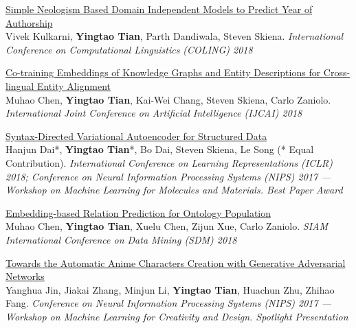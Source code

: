 \documentclass[line,margin]{cv}
\begin{document}
\begin{resume}
{  \begin{samepage}
  \href{http://aclweb.org/anthology/C18-1017}{Simple Neologism Based Domain Independent Models to Predict Year of Authorship}\\
  Vivek Kulkarni, \textbf{Yingtao Tian}, Parth Dandiwala, Steven Skiena. \emph{International Conference on Computational Linguistics (COLING) 2018}
  \par\end{samepage}

  \begin{samepage}
  \href{https://arxiv.org/abs/1806.06478}{Co-training Embeddings of Knowledge Graphs and Entity Descriptions for Cross-lingual Entity Alignment}\\
  Muhao Chen, \textbf{Yingtao Tian}, Kai-Wei Chang, Steven Skiena, Carlo Zaniolo. \emph{International Joint Conference on Artificial Intelligence (IJCAI) 2018}
  \par\end{samepage}

  \begin{samepage}
  \href{https://openreview.net/forum?id=SyqShMZRb}{Syntax-Directed Variational Autoencoder for Structured Data}\\
  Hanjun Dai*, \textbf{Yingtao Tian}*, Bo Dai, Steven Skiena, Le Song (* Equal Contribution). \emph{International Conference on Learning Representations (ICLR) 2018; Conference on Neural Information Processing Systems (NIPS) 2017 --- Workshop on Machine Learning for Molecules and Materials. Best Paper Award}
  \par\end{samepage}

  \begin{samepage}
  \href{https://arxiv.org/abs/1809.02382}{Embedding-based Relation Prediction for Ontology Population}\\
  Muhao Chen, \textbf{Yingtao Tian}, Xuelu Chen, Zijun Xue, Carlo Zaniolo. \emph{SIAM International Conference on Data Mining (SDM) 2018}
  \par\end{samepage}

  \begin{samepage}
  \href{https://nips2017creativity.github.io/doc/High\_Quality\_Anime.pdf}{Towards the Automatic Anime Characters Creation with Generative Adversarial Networks}\\
  Yanghua Jin, Jiakai Zhang, Minjun Li, \textbf{Yingtao Tian}, Huachun Zhu, Zhihao Fang. \emph{Conference on Neural Information Processing Systems (NIPS) 2017 --- Workshop on Machine Learning for Creativity and Design. Spotlight Presentation}
  \par\end{samepage}

}
\end{resume}
\end{document}
